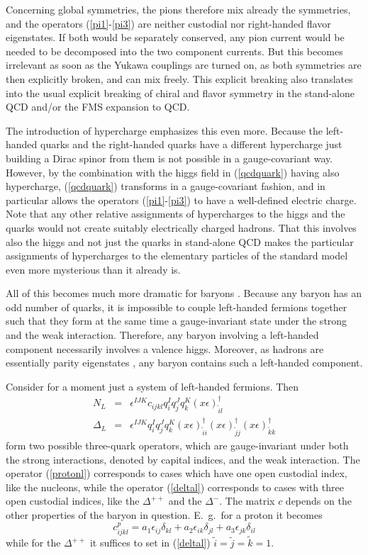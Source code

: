 \documentclass[final,twoside,12pt]{article}
\newcommand*{\no}{\noindent}
\newcommand*{\bea}{\begin{eqnarray}}
\newcommand*{\eea}{\end{eqnarray}}
\newcommand*{\be}{\begin{equation}}
\newcommand*{\ee}{\end{equation}}
\newcommand*{\pref}[1]{(\ref{#1})}
\newcommand*{\prefr}[2]{(\ref{#1}-\ref{#2})}
\newcommand*{\nn}{\nonumber}
\newcommand*{\1}{1\!\!\!\bot}
\begin{document}
Concerning global symmetries, the pions therefore mix already the symmetries, and the operators \prefr{pi1}{pi3} are neither custodial nor right-handed flavor eigenstates. If both would be separately conserved, any pion current would be needed to be decomposed into the two component currents. But this becomes irrelevant as soon as the Yukawa couplings are turned on, as both symmetries are then explicitly broken, and can mix freely. This explicit breaking also translates into the usual explicit breaking of chiral and flavor symmetry in the stand-alone QCD and/or the FMS expansion to QCD.

The introduction of hypercharge emphasizes this even more. Because the left-handed quarks and the right-handed quarks have a different hypercharge just building a Dirac spinor from them is not possible in a gauge-covariant way. However, by the combination with the higgs field in \pref{qcdquark} having also hypercharge, \pref{qcdquark} transforms in a gauge-covariant fashion, and in particular allows the operators \prefr{pi1}{pi3} to have a well-defined electric charge. Note that any other relative assignments of hypercharges to the higgs and the quarks would not create suitably electrically charged hadrons. That this involves also the higgs and not just the quarks in stand-alone QCD makes the particular assignments of hypercharges to the elementary particles of the standard model even more mysterious than it already is.

All of this becomes much more dramatic for baryons \cite{Egger:2017tkd}. Because any baryon has an odd number of quarks, it is impossible to couple left-handed fermions together such that they form at the same time a gauge-invariant state under the strong and the weak interaction. Therefore, any baryon involving a left-handed component necessarily involves a valence higgs. Moreover, as hadrons are essentially parity eigenstates \cite{pdg,Gattringer:2010zz,DeGrand:2006zz}, any baryon contains such a left-handed component.

Consider for a moment just a system of left-handed fermions. Then \cite{Egger:2017tkd}
\bea
N_L&=&\epsilon^{IJK} c_{ijkl} q_i^I q_j^J q_k^K (x\epsilon)^{\dagger}_{\tilde{i}l}\label{protonl}\\
\Delta_L&=&\epsilon^{IJK} q_i^I q_j^J q_k^K (x\epsilon)^{\dagger}_{\tilde{i}i} (x\epsilon)^{\dagger}_{\tilde{j}j} (x\epsilon)^{\dagger}_{\tilde{k}k}\label{deltal}
\eea
\no form two possible three-quark operators, which are gauge-invariant under both the strong interactions, denoted by capital indices, and the weak interaction. The operator \pref{protonl} corresponds to cases which have one open custodial index, like the nucleons, while the operator \pref{deltal} corresponds to cases with three open custodial indices, like the $\Delta^{++}$ and the $\Delta^{-}$. The matrix $c$ depends on the other properties of the baryon in question. E.\ g.\ for a proton it becomes \cite{Egger:2017tkd}
\be
c_{ijkl}^p=a_1\epsilon_{ij}\delta_{kl} + a_2\epsilon_{ik}\delta_{jl} + a_3\epsilon_{jk}\delta_{il}\nn
\ee
\no while for the $\Delta^{++}$ it suffices to set in \pref{deltal} $\tilde{i}=\tilde{j}=\tilde{k}=1$.
\end{document}

